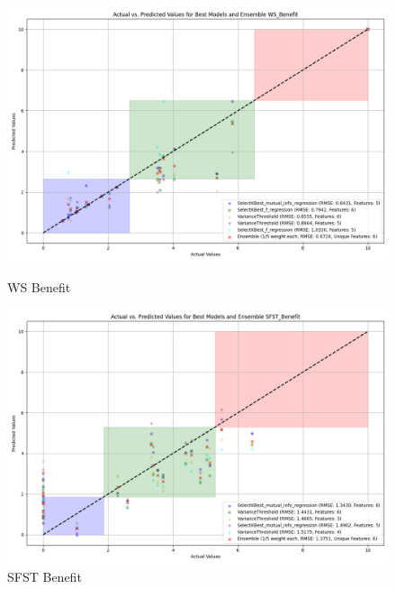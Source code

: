 \begin{figure}[H]
    \centering
    \begin{minipage}{0.45\textwidth}
        \centering
        \includegraphics[width=\linewidth]{reg_section_specific/images_reg_featred_ensemble/actual_vs_predicted_best_feature_selection_and_ensemble_WS_Benefit.png}
        \caption{WS Benefit}
        \label{fig_reg_spec:ws_ben_reg_featred_best_ensemble}
    \end{minipage}\hfill
    \begin{minipage}{0.45\textwidth}
        \centering
        \includegraphics[width=\linewidth]{reg_section_specific/images_reg_featred_ensemble/actual_vs_predicted_best_feature_selection_and_ensemble_SFST_Benefit.png}
        \caption{SFST Benefit}
        \label{fig_reg_spec:sfst_ben_reg_featred_best_ensemble}
    \end{minipage}
\end{figure}

